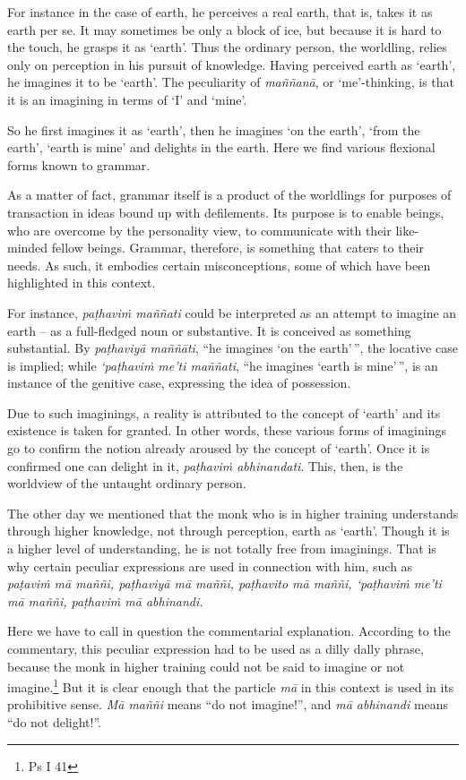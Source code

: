 For instance in the case of earth, he perceives a real earth, that is, takes it as earth per se. It may sometimes be only a block of ice, but because it is hard to the touch, he grasps it as `earth'. Thus the ordinary person, the worldling, relies only on perception in his pursuit of knowledge. Having perceived earth as `earth', he imagines it to be `earth'. The peculiarity of \emph{maññanā}, or `me'-thinking, is that it is an imagining in terms of `I' and `mine'.

So he first imagines it as `earth', then he imagines `on the earth', `from the earth', `earth is mine' and delights in the earth. Here we find various flexional forms known to grammar.

As a matter of fact, grammar itself is a product of the worldlings for purposes of transaction in ideas bound up with defilements. Its purpose is to enable beings, who are overcome by the personality view, to communicate with their like-minded fellow beings. Grammar, therefore, is something that caters to their needs. As such, it embodies certain misconceptions, some of which have been highlighted in this context.

For instance, \emph{paṭhaviṁ maññati} could be interpreted as an attempt to imagine an earth -- as a full-fledged noun or substantive. It is conceived as something substantial. By \emph{paṭhaviyā maññāti}, ``he imagines `on the earth'\,'', the locative case is implied; while \emph{`paṭhaviṁ me'ti maññati}, ``he imagines `earth is mine'\,'', is an instance of the genitive case, expressing the idea of possession.

Due to such imaginings, a reality is attributed to the concept of `earth' and its existence is taken for granted. In other words, these various forms of imaginings go to confirm the notion already aroused by the concept of `earth'. Once it is confirmed one can delight in it, \emph{paṭhaviṁ abhinandati}. This, then, is the worldview of the untaught ordinary person.

The other day we mentioned that the monk who is in higher training understands through higher knowledge, not through perception, earth as `earth'. Though it is a higher level of understanding, he is not totally free from imaginings. That is why certain peculiar expressions are used in connection with him, such as \emph{paṭaviṁ mā maññi, paṭhaviyā mā maññi, paṭhavito mā maññi, `paṭhaviṁ me'ti mā maññi, paṭhaviṁ mā abhinandi.}

Here we have to call in question the commentarial explanation. According to the commentary, this peculiar expression had to be used as a dilly dally phrase, because the monk in higher training could not be said to imagine or not imagine.\footnote{Ps I 41} But it is clear enough that the particle \emph{mā} in this context is used in its prohibitive sense. \emph{Mā maññi} means ``do not imagine!'', and \emph{mā abhinandi} means ``do not delight!''.

